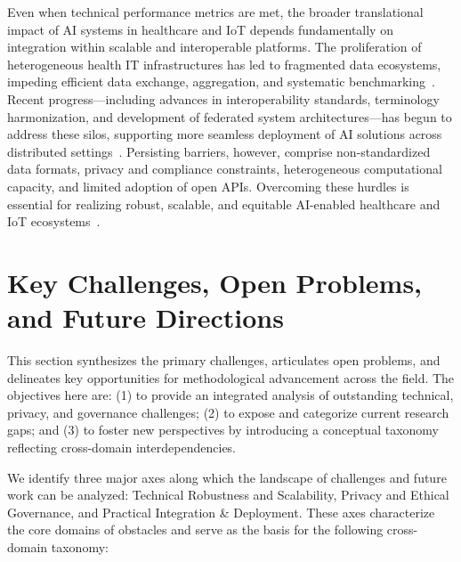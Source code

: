 \documentclass[sigconf]{acmart}
\begin{document}
Even when technical performance metrics are met, the broader translational impact of AI systems in healthcare and IoT depends fundamentally on integration within scalable and interoperable platforms. The proliferation of heterogeneous health IT infrastructures has led to fragmented data ecosystems, impeding efficient data exchange, aggregation, and systematic benchmarking~\cite{ref33,ref35,ref46,ref65}. Recent progress—including advances in interoperability standards, terminology harmonization, and development of federated system architectures—has begun to address these silos, supporting more seamless deployment of AI solutions across distributed settings~\cite{ref35,ref46,ref47}. Persisting barriers, however, comprise non-standardized data formats, privacy and compliance constraints, heterogeneous computational capacity, and limited adoption of open APIs. Overcoming these hurdles is essential for realizing robust, scalable, and equitable AI-enabled healthcare and IoT ecosystems~\cite{ref34,ref65}.

\section{Key Challenges, Open Problems, and Future Directions}

This section synthesizes the primary challenges, articulates open problems, and delineates key opportunities for methodological advancement across the field. The objectives here are: (1) to provide an integrated analysis of outstanding technical, privacy, and governance challenges; (2) to expose and categorize current research gaps; and (3) to foster new perspectives by introducing a conceptual taxonomy reflecting cross-domain interdependencies.

We identify three major axes along which the landscape of challenges and future work can be analyzed: Technical Robustness and Scalability, Privacy and Ethical Governance, and Practical Integration \& Deployment. These axes characterize the core domains of obstacles and serve as the basis for the following cross-domain taxonomy:
\end{document}
